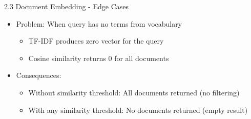 \documentclass{beamer}
\begin{document}
\begin{frame}{2.3 Document Embedding - Edge Cases}
    \begin{itemize}
        \item Problem: When query has no terms from vocabulary
        \begin{itemize}
            \item TF-IDF produces zero vector for the query
            \item Cosine similarity returns 0 for all documents
        \end{itemize}
        \item Consequences:
        \begin{itemize}
            \item Without similarity threshold: All documents returned (no filtering)
            \item With any similarity threshold: No documents returned (empty result)
        \end{itemize}
    \end{itemize}
\end{frame}
\end{document}
